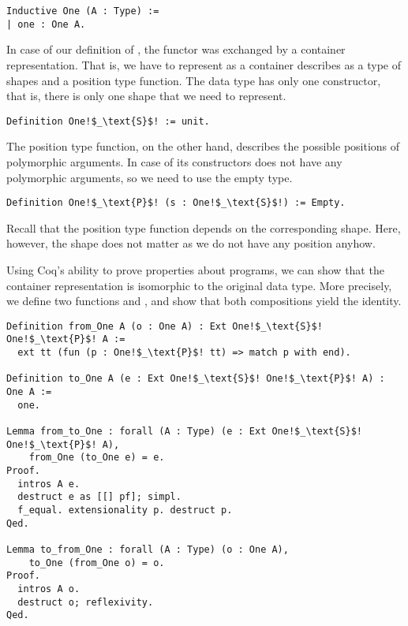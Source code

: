 \begin{verbatim}
Inductive One (A : Type) :=
| one : One A.
\end{verbatim}

In case of our definition of , the functor was exchanged by
a container representation.
That is, we have to represent  as a container
describes as a type of shapes and a position type function.
The data type  has only one constructor, that is,
there is only one shape that we need to represent.

\begin{verbatim}
Definition One!$_\text{S}$! := unit.
\end{verbatim}

The position type function, on the other hand, describes the possible
positions of polymorphic arguments.
In case of  its constructors does not have any
polymorphic arguments, so we need to use the empty type.

\begin{verbatim}
Definition One!$_\text{P}$! (s : One!$_\text{S}$!) := Empty.
\end{verbatim}

Recall that the position type function depends on the corresponding
shape.
Here, however, the shape does not matter as we do not have any
position anyhow.

Using Coq's ability to prove properties about programs, we can show
that the container representation is isomorphic to the original data
type.
More precisely, we define two functions  and
, and show that both compositions yield the
identity.

\begin{verbatim}
Definition from_One A (o : One A) : Ext One!$_\text{S}$! One!$_\text{P}$! A :=
  ext tt (fun (p : One!$_\text{P}$! tt) => match p with end).

Definition to_One A (e : Ext One!$_\text{S}$! One!$_\text{P}$! A) : One A :=
  one.

Lemma from_to_One : forall (A : Type) (e : Ext One!$_\text{S}$! One!$_\text{P}$! A),
    from_One (to_One e) = e.
Proof.
  intros A e.
  destruct e as [[] pf]; simpl.
  f_equal. extensionality p. destruct p.
Qed.

Lemma to_from_One : forall (A : Type) (o : One A),
    to_One (from_One o) = o.
Proof.
  intros A o.
  destruct o; reflexivity.
Qed.\end{verbatim}

